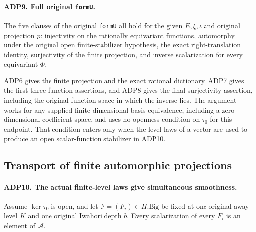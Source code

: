 \paragraph{ADP9. Full original \texttt{formU}.}
\label{claim:ADP9}
The five clauses of the original \texttt{formU} all hold for the given
\(E,\xi,\iota\) and original projection \(p\): injectivity on the
rationally equivariant functions, automorphy under the original open
finite-stabilizer hypothesis, the exact right-translation identity,
surjectivity of the finite projection, and inverse scalarization for every
equivariant \(\Phi\).

ADP6 gives the finite projection and the exact rational dictionary.
ADP7 gives the first three function assertions, and ADP8 gives the final
surjectivity assertion, including the original function space in which
the inverse lies.  The argument works for any supplied finite-dimensional
basis equivalence, including a zero-dimensional coefficient space, and
uses no openness condition on \(\tau_0\) for this endpoint.  That
condition enters only when the level laws of a vector are used to produce
an open scalar-function stabilizer in ADP10.

\subsection{Transport of finite automorphic projections}

\paragraph{ADP10. The actual finite-level laws give simultaneous smoothness.}
\label{claim:ADP10}
Assume \(\ker\tau_0\) is open, and let \(F=(F_i)\in H.\mathrm{Big}\)
be fixed at one original away level \(K\) and one original Iwahori
depth \(b\).  Every scalarization of every \(F_i\) is an element of
\(\mathcal A\).

